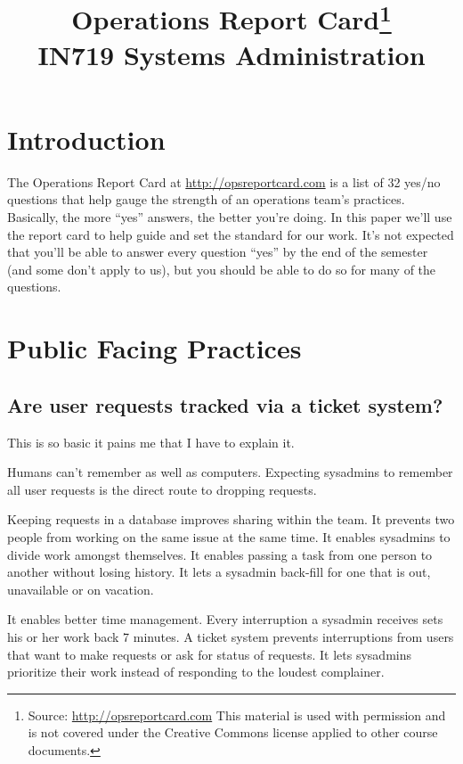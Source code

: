 \documentclass{article}
\begin{document}
\title{Operations Report Card\footnote{Source: \url{http://opsreportcard.com} This material is used with permission and is not covered under the Creative Commons license applied to other course documents.} \\ IN719 Systems Administration}
\date{}
\maketitle

\section*{Introduction}
The Operations Report Card at \url{http://opsreportcard.com} is a list of 32 yes/no questions that help gauge the strength of an operations team's practices. Basically, the more ``yes'' answers, the better you're doing. In this paper we'll use the report card to help guide and set the standard for our work. It's not expected that you'll be able to answer every question ``yes'' by the end of the semester (and some don't apply to us), but you should be able to do so for many of the questions.

\section{Public Facing Practices}

\subsection{Are user requests tracked via a ticket system? \Checkmark}
This is so basic it pains me that I have to explain it.

Humans can't remember as well as computers. Expecting sysadmins to remember all user requests is the direct route to dropping requests.

Keeping requests in a database improves sharing within the team. It prevents two people from working on the same issue at the same time. It enables sysadmins to divide work amongst themselves. It enables passing a task from one person to another without losing history. It lets a sysadmin back-fill for one that is out, unavailable or on vacation.

It enables better time management. Every interruption a sysadmin receives sets his or her work back 7 minutes. A ticket system prevents interruptions from users that want to make requests or ask for status of requests. It lets sysadmins prioritize their work instead of responding to the loudest complainer.
\end{document}
